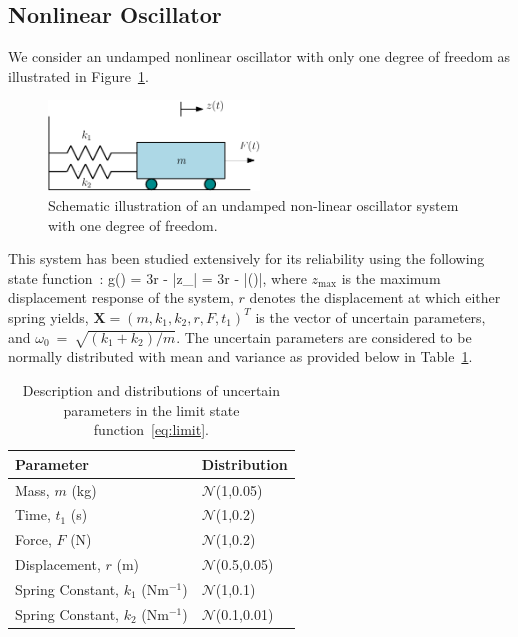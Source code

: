 \subsection{Nonlinear Oscillator}
We consider an undamped nonlinear oscillator with only one degree of
freedom as illustrated in Figure~\ref{fig:osc}. 
\begin{figure}[htbp]
 \begin{center}
  \includegraphics[width=0.5\textwidth]{./Figures/oscillator}
\caption{Schematic illustration of an undamped non-linear oscillator system with one degree of freedom.}
\label{fig:osc}
\end{center}
\end{figure}
This system has been studied extensively for its reliability using
the following state function~\cite{Bucher:1989,Bucher:1990,Rajashekhar:1993,Schueremans:2005,Gayton:2003}:
%
\be
g() = 3r - \left|z_\right| = 3r - 
\left|\sin\left(\right)\right|,
\label{eq:limit}
\ee
\noindent where $z_\text{max}$ is the maximum displacement response of the system, $r$ denotes the displacement at
which either spring yields, $\bm{X}=(m,k_1,k_2,r,F,t_1)^T$ is the vector 
of uncertain parameters, and   
$\omega_0~=~\sqrt{(k_1+k_2)/m}$. The uncertain parameters are considered to be normally distributed with mean
and variance as provided below in Table~\ref{tab:osc}.

\begin{table}[htbp]
\renewcommand*{\arraystretch}{1.2}
\begin{center}
\begin{tabular}{ll}
\toprule
\textbf{Parameter} & \textbf{Distribution} \\ 
\bottomrule
Mass, $m$ (kg) & $\mathcal{N}$(1,0.05) \\
Time, $t_1$ (s) & $\mathcal{N}$(1,0.2) \\
Force, $F$ (N) & $\mathcal{N}$(1,0.2) \\
Displacement, $r$ (m) & $\mathcal{N}$(0.5,0.05) \\
Spring Constant, $k_1$ (Nm$^{-1}$) & $\mathcal{N}$(1,0.1) \\
Spring Constant, $k_2$ (Nm$^{-1}$) & $\mathcal{N}$(0.1,0.01) \\
\bottomrule
\end{tabular}
\end{center}

\caption{Description and distributions of uncertain parameters in the limit state function~\eqref{eq:limit}.}
\label{tab:osc}
\end{table}

